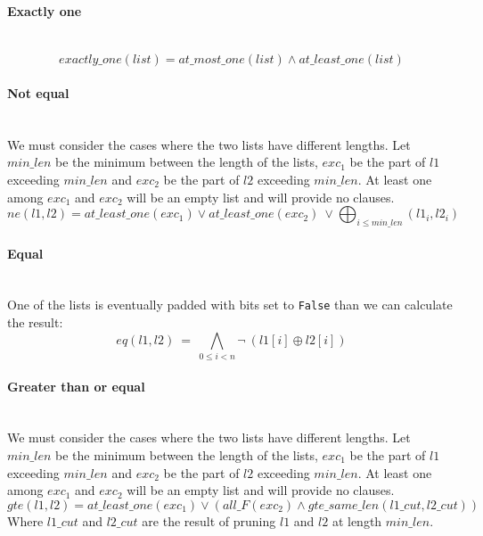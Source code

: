   \paragraph*{Exactly one} \hfill \\
    \begin{equation*}
      exactly\_one(list) = at\_most\_one(list) \land at\_least\_one(list)
    \end{equation*}

  \paragraph*{Not equal} \hfill \\
  We must consider the cases where the two lists have different lengths.
  Let \(min\_len\)  be the minimum between the length of the lists, \(exc_1\)  be the part of \(l1\) 
  exceeding \(min\_len\)  and \(exc_2\)  be the part of \(l2\)  exceeding \(min\_len\). At least one 
  among \(exc_1\)  and \(exc_2\)  will be an empty list and will provide no clauses.\\
  \begin{equation*}
    ne(l1, l2) = at\_least\_one(exc_1) \lor at\_least\_one(exc_2)\ \lor \bigoplus_{i \leq min\_len}(l1_i, l2_i)
  \end{equation*}

  \paragraph*{Equal} \hfill \\
    One of the lists is eventually padded with bits set to \texttt{False} than we can
    calculate the result:
    \begin{equation*}
      eq(l1, l2)\ =\ \bigwedge_{0 \leq i < n} \neg\ (l1[i] \oplus l2[i])
    \end{equation*}

  \paragraph*{Greater than or equal} \hfill \\
    We must consider the cases where the two lists have different lengths.
    Let \(min\_len\)  be the minimum between the length of the lists, \(exc_1\)  be the part of \(l1\)  
    exceeding \(min\_len\)  and \(exc_2\)  be the part of \(l2\)  exceeding \(min\_len\). At least one among
    \(exc_1\)  and \(exc_2\)  will be an empty list and will provide no clauses.\\
    \begin{equation*}
          gte(l1, l2) = at\_least\_one(exc_1) \lor ( all\_F(exc_2) \land gte\_same\_len(l1\_cut, l2\_cut))
    \end{equation*}
    Where \(l1\_cut\)  and \(l2\_cut\)  are the result of pruning \(l1\)  and \(l2\)  at length \(min\_len\).\\

